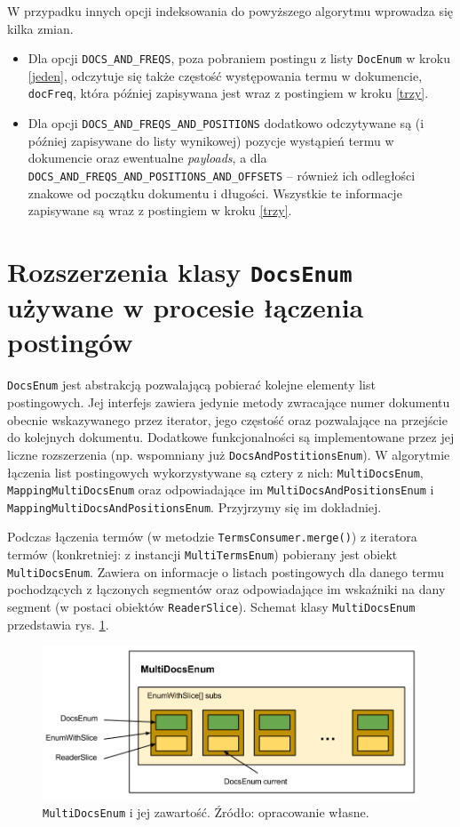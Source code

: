 W przypadku innych opcji indeksowania do powyższego algorytmu wprowadza się kilka zmian.
\begin{itemize}
 \item Dla opcji \texttt{DOCS\_AND\_FREQS}, poza pobraniem postingu z listy \texttt{DocEnum} w kroku \ref{jeden}, odczytuje się także częstość występowania termu w dokumencie, \texttt{docFreq}, która później zapisywana jest wraz z postingiem w kroku \ref{trzy}.
 \item Dla opcji \texttt{DOCS\_AND\_FREQS\_AND\_POSITIONS} dodatkowo odczytywane są (i później zapisywane do listy wynikowej) pozycje wystąpień termu w dokumencie oraz ewentualne \emph{payloads}, a dla \texttt{DOCS\_AND\_FREQS\_AND\_POSITIONS\_AND\_OFFSETS} -- również ich odległości znakowe od początku dokumentu i długości. Wszystkie te informacje zapisywane są wraz z postingiem w kroku \ref{trzy}.
\end{itemize}

\section{Rozszerzenia klasy \texttt{DocsEnum} używane w procesie łączenia postingów}

\texttt{DocsEnum} jest abstrakcją pozwalającą pobierać kolejne elementy list postingowych. Jej interfejs zawiera jedynie metody zwracające numer dokumentu obecnie wskazywanego przez iterator, jego częstość oraz pozwalające na przejście do kolejnych dokumentu. Dodatkowe funkcjonalności są implementowane przez jej liczne rozszerzenia (np. wspomniany już \texttt{DocsAndPostitionsEnum}). W algorytmie łączenia list postingowych wykorzystywane są cztery z nich: \texttt{MultiDocsEnum}, \texttt{MappingMultiDocsEnum} oraz odpowiadające im \texttt{MultiDocsAndPositionsEnum} i \texttt{MappingMultiDocsAndPositionsEnum}. Przyjrzymy się im dokładniej.

Podczas łączenia termów (w metodzie \texttt{TermsConsumer.merge()}) z iteratora termów (konkretniej: z instancji \texttt{MultiTermsEnum}) pobierany jest obiekt \texttt{MultiDocsEnum}. Zawiera on informacje o listach postingowych dla danego termu pochodzących z łączonych segmentów oraz odpowiadające im wskaźniki na dany segment (w postaci obiektów \texttt{ReaderSlice}). Schemat klasy \texttt{MultiDocsEnum} przedstawia rys. \ref{fig:multiDocsEnum}.

\begin{figure}[here]
 \includegraphics[scale=0.4]{pictures/MultiDocsEnum.png}
 \caption{\texttt{MultiDocsEnum} i jej zawartość. Źródło: opracowanie własne. \label{fig:multiDocsEnum}}
\end{figure}

